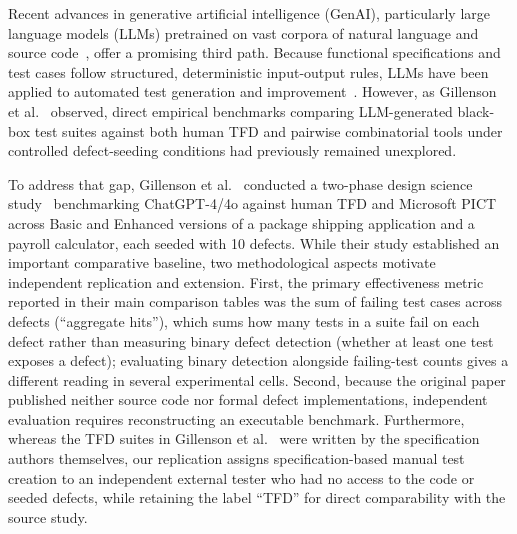 \documentclass[acmsmall]{acmart}
\begin{document}
Recent advances in generative artificial intelligence (GenAI), particularly large language models (LLMs) pretrained on vast corpora of natural language and source code~\cite{Brown2020, OpenAI2023}, offer a promising third path. Because functional specifications and test cases follow structured, deterministic input-output rules, LLMs have been applied to automated test generation and improvement~\cite{Alshahwan2024, Ouedraogo2024, Yang2024}. However, as Gillenson et al.~\cite{Gillenson2026} observed, direct empirical benchmarks comparing LLM-generated black-box test suites against both human TFD and pairwise combinatorial tools under controlled defect-seeding conditions had previously remained unexplored.

To address that gap, Gillenson et al.~\cite{Gillenson2026} conducted a two-phase design science study~\cite{Hevner2004, Peffers2007} benchmarking ChatGPT-4/4o against human TFD and Microsoft PICT across Basic and Enhanced versions of a package shipping application and a payroll calculator, each seeded with 10 defects. While their study established an important comparative baseline, two methodological aspects motivate independent replication and extension. First, the primary effectiveness metric reported in their main comparison tables was the sum of failing test cases across defects (``aggregate hits''), which sums how many tests in a suite fail on each defect rather than measuring binary defect detection (whether at least one test exposes a defect); evaluating binary detection alongside failing-test counts gives a different reading in several experimental cells. Second, because the original paper published neither source code nor formal defect implementations, independent evaluation requires reconstructing an executable benchmark. Furthermore, whereas the TFD suites in Gillenson et al.~\cite{Gillenson2026} were written by the specification authors themselves, our replication assigns specification-based manual test creation to an independent external tester who had no access to the code or seeded defects, while retaining the label ``TFD'' for direct comparability with the source study.
\end{document}
